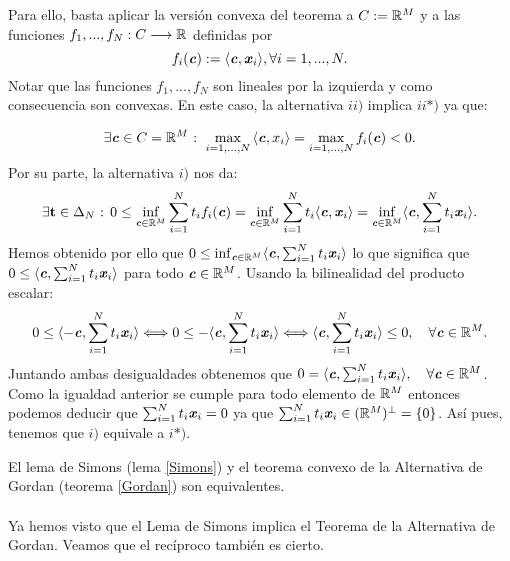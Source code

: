 Para ello, basta aplicar la versión convexa del teorema a $ C := \mathbb{R}^M $ y a las funciones $ f_1,...,f_N : C \longrightarrow \mathbb{R} $ definidas por \[ f_i(\textbf{\emph{c}}):=\langle \textbf{\emph{c}}, \textbf{\emph{x}}_i \rangle , \forall i=1,...,N.\] Notar que las funciones $ f_1,...,f_N $ son lineales por la izquierda y como consecuencia son convexas. En este caso, la alternativa $ ii) $ implica $ ii*) $ ya que:

\begin{equation*}
\exists \textbf{\emph{c}} \in C = \mathbb{R}^M \text{ : } \max_{i=1,...,N} {\langle \textbf{\emph{c}},x_i \rangle}  =  \max_{i=1,...,N}f_i (\textbf{\emph{c}}) < 0 .
\end{equation*}
Por su parte, la alternativa $ i) $ nos da:
\begin{equation*}
\exists \mathbf{t} \in \Delta_N \text{ : } 0 \leq \inf_{\textbf{\emph{c}} \in \mathbb{R}^M}  \sum_{i=1}^{N}{t_i f_i(\textbf{\emph{c}}) } = \inf_{\textbf{\emph{c}} \in \mathbb{R}^M} \sum_{i=1}^{N}{t_i\langle \textbf{\emph{c}}, \textbf{\emph{x}}_i \rangle} = \inf_{\textbf{\emph{c}} \in \mathbb{R}^M} \langle \textbf{\emph{c}}, \sum_{i=1}^{N}{t_i 	\textbf{\emph{x}}_i} \rangle. 
\end{equation*}
Hemos obtenido por ello que  $0  \leq \inf_{\textbf{\emph{c}} \in \mathbb{R}^M} \langle \textbf{\emph{c}}, \sum_{i=1}^{N}{t_i \textbf{\emph{x}}_i} \rangle  $ lo que significa que $ 0 \leq \langle \textbf{\emph{c}}, \sum_{i=1}^{N}{t_i \textbf{\emph{x}}_i} \rangle  $ para todo $ \textbf{\emph{c}} \in \mathbb{R}^M $. Usando la bilinealidad del producto escalar:
\[
0 \leq \langle -\textbf{\emph{c}}, \sum_{i=1}^{N}{t_i \textbf{\emph{x}}_i} \rangle \Longleftrightarrow 	0 \leq -\langle \textbf{\emph{c}}, \sum_{i=1}^{N}{t_i \textbf{\emph{x}}_i} \rangle 
\Longleftrightarrow  \langle \textbf{\emph{c}}, \sum_{i=1}^{N}{t_i \textbf{\emph{x}}_i}\rangle \leq 0, \quad \forall \textbf{\emph{c}} \in \mathbb{R}^M.
\]
Juntando ambas desigualdades obtenemos que $ 0 =  \langle \textbf{\emph{c}}, \sum_{i=1}^{N}{t_i \textbf{\emph{x}}_i}\rangle, \quad \forall \textbf{\emph{c}} \in \mathbb{R}^M $. Como la igualdad anterior se cumple para todo elemento de $ \mathbb{R}^M $ entonces podemos deducir que $ \sum_{i=1}^{N}{t_i \textbf{\emph{x}}_i} = 0 $	ya que $ \sum_{i=1}^{N}{t_i \textbf{\emph{x}}_i} \in (\mathbb{R}^M)^{\perp} = \{0\} $. Así pues, tenemos que $ i) $ equivale a $ i*) $. \hspace{8.5cm}\qedsymbol 

\bigskip
\begin{observacion}
	El lema de Simons (lema \ref{Simons}) y el teorema convexo de la Alternativa de Gordan (teorema \ref{Gordan}) son equivalentes.
\end{observacion}

\paragraph{} Ya hemos visto que el Lema de Simons implica el Teorema de la Alternativa de Gordan. Veamos que el recíproco también es cierto.  \\


